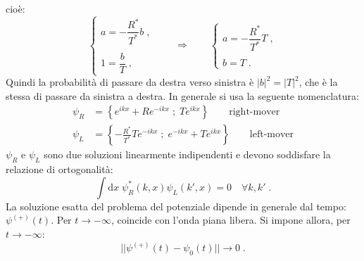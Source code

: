 \documentclass[12pt,a4paper]{report}
\theoremstyle{definition}
\numberwithin{equation}{section}
\newcommand{\diff}[1][]{\mathrm{d}#1}
\begin{document}
cioè:
\begin{equation}
\begin{cases}
a=-\dfrac{R^*}{T^*}b\;, \\
\\
1=\dfrac{b}{T}\;,
\end{cases}\qquad \Longrightarrow\qquad
\begin{cases}
a=-\dfrac{R^*}{T^*}T\;, \\
\\
b=T\;.
\end{cases}
\end{equation}
Quindi la probabilità di passare da destra verso sinistra è $|b|^2=|T|^2$, che è la stessa di passare da sinistra a destra. In generale si usa la seguente nomenclatura:
\begin{align}
\psi_R &=\left\{e^{ikx}+Re^{-ikx}\; ;\; Te^{ikx}\right\} \qquad \mbox{right-mover} \\
\psi_L &=\left\{-\frac{R^*}{T^*}Te^{-ikx}\; ;\; e^{-ikx}+Te^{ikx}\right\}\qquad \mbox{left-mover}
\end{align}
$\psi_R$ e $\psi_L$ sono due soluzioni linearmente indipendenti e devono soddisfare la relazione di ortogonalità:
\begin{equation}
\int\diff{x}\;\psi_R^*(k,x)\psi_L(k',x)=0 \quad \forall k,k'\;.
\end{equation}
La soluzione esatta del problema del potenziale dipende in generale dal tempo: $\psi^{(+)}(t)$. Per $t\to-\infty$, coincide con l'onda piana libera. Si impone allora, per $t\to-\infty$:
\begin{equation}
||\psi^{(+)}(t)-\psi_0(t)||\to 0\;.
\end{equation}
\end{document}
